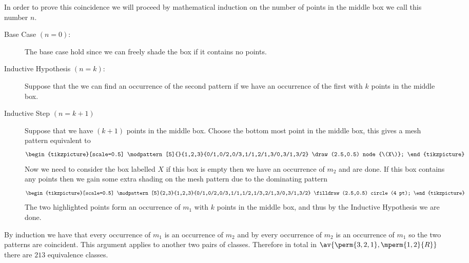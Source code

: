 In order to prove this coincidence we will proceed by mathematical
induction on the number of points in the middle box we call this number \(n\).
\begin{description}
    \item [Base Case \((n=0)\):] The base case hold since we can freely shade the
        box if it contains no points.
    \item [Inductive Hypothesis \((n=k)\):] Suppose that the we can find an occurrence
        of the second pattern if we have an occurrence of the first with \(k\) points
        in the middle box.
    \item [Inductive Step \((n=k+1)\)] Suppose that we have \((k+1)\) points in
        the middle box. Choose the bottom most point in the middle box, this gives a
        mesh pattern equivalent to
     \begin{equation*}
        \begin{tikzpicture}[scale=0.5]
            \modpattern[5]{}{1,2,3}{0/1,0/2,0/3,1/1,2/1,3/0,3/1,3/2}
            \draw (2.5,0.5) node {\(X\)};
        \end{tikzpicture}
    \end{equation*}
        Now we need to consider the box labelled \(X\) if this box is empty then
        we have an occurrence of \(m_2\) and are done. If this box contains
        any points then we gain some extra shading on the mesh pattern
        due to the dominating pattern
     \begin{equation*}
        \begin{tikzpicture}[scale=0.5]
            \modpattern[5]{2,3}{1,2,3}{0/1,0/2,0/3,1/1,1/2,1/3,2/1,3/0,3/1,3/2}
            \filldraw (2.5,0.5) circle (4 pt);
        \end{tikzpicture}
    \end{equation*}
        The two highlighted points form an occurrence of \(m_1\) with \(k\)
        points in the middle box, and thus by the Inductive Hypothesis we
        are done.
\end{description}
By induction we have that every occurrence of \(m_1\) is an occurrence of \(m_2\)
and by  every occurrence of \(m_2\) is an occurrence of
\(m_1\) so the two patterns are coincident.
This argument applies to another two pairs of classes. Therefore in
total in \(\av{\perm{3,2,1}, \mperm{1,2}{R}}\) there are \(213\) equivalence
classes.
